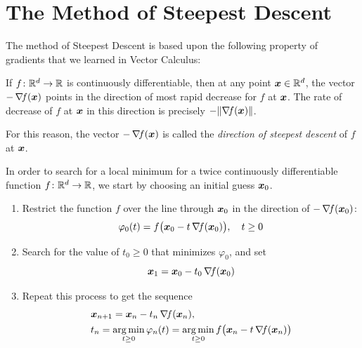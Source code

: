 
\section{The Method of Steepest Descent}

The method of Steepest Descent is based upon the following property of gradients that we learned in Vector Calculus:

\begin{theorem}
If $f \colon \mathbb{R}^d \to \mathbb{R}$ is continuously differentiable, then at any point $\boldsymbol{x} \in \mathbb{R}^d$, the vector $-\mathop{\nabla\! {f}}(\boldsymbol{x})$ points in the direction of most rapid decrease for $f$ at $\boldsymbol{x}$.  The rate of decrease of $f$ at $\boldsymbol{x}$ in this direction is precisely $-\lVert \mathop{\nabla\! {f}}(\boldsymbol{x}) \rVert$.
\end{theorem}

\begin{remark}
For this reason, the vector $-\mathop{\nabla\! {f}}(\boldsymbol{x})$ is called the \emph{direction of steepest descent} of $f$ at $\boldsymbol{x}$.
\end{remark}

\separator

In order to search for a local minimum for a twice continuously differentiable function $f\colon \mathbb{R}^d \to \mathbb{R}$, we start by choosing an initial guess $\boldsymbol{x}_0$.  
\begin{enumerate}
	\item Restrict the function $f$ over the line through $\boldsymbol{x}_0$ in the direction of $-\mathop{\nabla\! {f}}(\boldsymbol{x}_0)$:
	\begin{equation*}
	\varphi_0(t) = f\big( \boldsymbol{x}_0 - t \mathop{\nabla\! {f}}(\boldsymbol{x}_0) \big), \quad t\geq 0
	\end{equation*}
	\item Search for the value of $t_0 \geq 0$ that minimizes $\varphi_0$, and set 
	\begin{equation*}
	\boldsymbol{x}_1 = \boldsymbol{x}_0 - t_0\mathop{\nabla\! {f}}(\boldsymbol{x}_0)
	\end{equation*}
	\item Repeat this process to get the sequence
	\begin{gather}\label{equation:SteepestDescent}
	\begin{split}
	&\boldsymbol{x}_{n+1} = \boldsymbol{x}_n - t_n \mathop{\nabla\! {f}}(\boldsymbol{x}_n), \\ &t_n = \operatorname*{arg\,min}_{t\geq 0} \varphi_n(t) = \operatorname*{arg\,min}_{t\geq 0} f\big(\boldsymbol{x}_n - t\mathop{\nabla\! {f}}(\boldsymbol{x}_n)\big)
	\end{split}
	\end{gather}
\end{enumerate}

